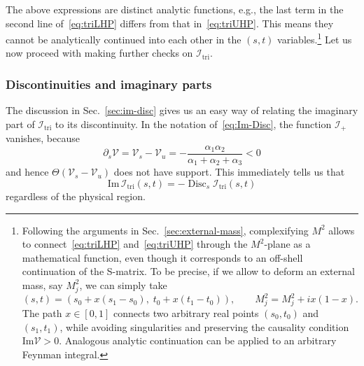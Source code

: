 \documentclass[12pt]{article}
\numberwithin{figure}{section}
\DeclareMathOperator{\Disc}{Disc}
\def \be {\begin{equation}}
\def \ee {\end{equation}}
\def \V {\mathcal{V}}
\def \I {\mathcal{I}}
\def \Im {\mathrm{Im}}
\def \triangle {\mathrm{tri}}
\begin{document}
    The above expressions are distinct analytic functions, e.g., the last term in the second line of~\eqref{eq:triLHP} differs from that in~\eqref{eq:triUHP}. This means they cannot be analytically continued into each other in the $(s,t)$ variables.\footnote{Following the arguments in Sec.~\ref{sec:external-mass}, complexifying $M^2$ allows to connect~\eqref{eq:triLHP} and~\eqref{eq:triUHP} through the $M^2$-plane as a mathematical function, even though it corresponds to an off-shell continuation of the S-matrix. To be precise, if we allow to deform an external mass, say $M_j^2$, we can simply take
    \be
    (s,t) = \left(s_0 + x(s_1 {-} s_0),\; t_0 + x(t_1 {-} t_0)\right), \qquad M^2_j = M^2_j + i x (1-x).
    \ee
    The path $x \in [0,1]$ connects two arbitrary real points $(s_0,t_0)$ and $(s_1,t_1)$, while avoiding singularities and preserving the causality condition $\Im \V > 0$. Analogous analytic continuation can be applied to an arbitrary Feynman integral.
    } Let us now proceed with making further checks on $\I_{\triangle}$.
    
    \subsubsection{Discontinuities and imaginary parts}
    
    The discussion in Sec.~\ref{sec:im-disc} gives us an easy way of relating the imaginary part of $\I_\triangle$ to its discontinuity.
    In the notation of~\eqref{eq:Im-Disc}, the function $\I_+$ vanishes, because
    \be
    \partial_s \V = \V_s - \V_u = - \frac{\alpha_1\alpha_2}{\alpha_1+\alpha_2+\alpha_3} < 0
    \ee
    and hence $\Theta(\V_s - \V_u)$ does not have support. This immediately tells us that
    \be\label{eq:Im-minus-Disc}
    \Im\, \I_{\triangle}(s,t) = - \Disc_s \I_{\triangle}(s,t)
    \ee
    regardless of the physical region.
    
\end{document}
